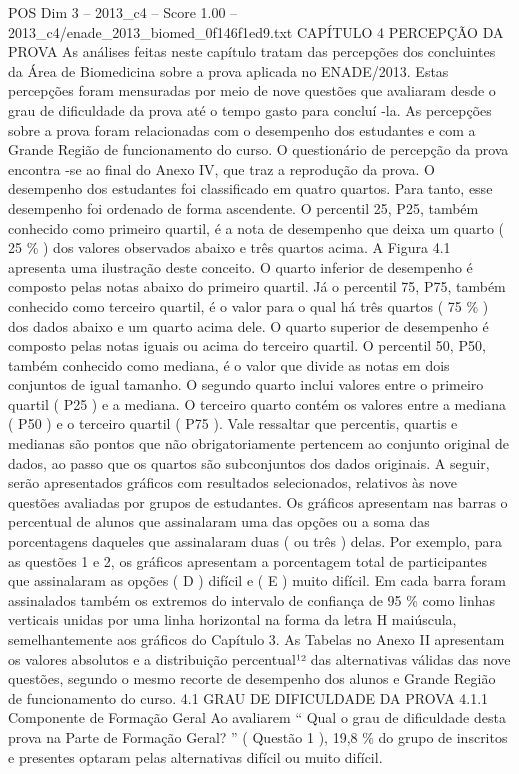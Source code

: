 \begin{textsample}{POS Dim 3 – 2013\_c4 – Score 1.00 – 2013\_c4/enade\_2013\_biomed\_0f146f1ed9.txt}  \label{ex:f3_pos_162}
CAPÍTULO 4 PERCEPÇÃO DA PROVA As análises feitas neste capítulo tratam das percepções dos concluintes da Área de Biomedicina sobre a prova aplicada no ENADE/2013.
Estas percepções foram mensuradas por meio de nove questões que avaliaram desde o grau de dificuldade da prova até o tempo gasto para concluí -la.
As percepções sobre a prova foram relacionadas com o desempenho dos estudantes e com a Grande Região de funcionamento do curso.
O questionário de percepção da prova encontra -se ao final do Anexo IV, que traz a reprodução da prova.
O desempenho dos estudantes foi classificado em quatro quartos.
Para tanto, esse desempenho foi ordenado de forma ascendente.
O percentil 25, P25, também conhecido como primeiro quartil, é a nota de desempenho que deixa um quarto ( 25 \% ) dos valores observados abaixo e três quartos acima.
A Figura 4.1 apresenta uma ilustração deste conceito.
O quarto inferior de desempenho é composto pelas notas abaixo do primeiro quartil.
Já o percentil 75, P75, também conhecido como terceiro quartil, é o valor para o qual há três quartos ( 75 \% ) dos dados abaixo e um quarto acima dele.
O quarto superior de desempenho é composto pelas notas iguais ou acima do terceiro quartil.
O percentil 50, P50, também conhecido como mediana, é o valor que divide as notas em dois conjuntos de igual tamanho.
O segundo quarto inclui valores entre o primeiro quartil ( P25 ) e a mediana.
O terceiro quarto contém os valores entre a mediana ( P50 ) e o terceiro quartil ( P75 ).
Vale ressaltar que percentis, quartis e medianas são pontos que não obrigatoriamente pertencem ao conjunto original de dados, ao passo que os quartos são subconjuntos dos dados originais.
A seguir, serão apresentados gráficos com resultados selecionados, relativos às nove questões avaliadas por grupos de estudantes.
Os gráficos apresentam nas barras o percentual de alunos que assinalaram uma das opções ou a soma das porcentagens daqueles que assinalaram duas ( ou três ) delas.
Por exemplo, para as questões 1 e 2, os gráficos apresentam a porcentagem total de participantes que assinalaram as opções ( D ) difícil e ( E ) muito difícil.
Em cada barra foram assinalados também os extremos do intervalo de confiança de 95 \% como linhas verticais unidas por uma linha horizontal na forma da letra H maiúscula, semelhantemente aos gráficos do Capítulo 3.
As Tabelas no Anexo II apresentam os valores absolutos e a distribuição percentual¹² das alternativas válidas das nove questões, segundo o mesmo recorte de desempenho dos alunos e Grande Região de funcionamento do curso. 4.1 GRAU DE DIFICULDADE DA PROVA 4.1.1 Componente de Formação Geral Ao avaliarem “ Qual o grau de dificuldade desta prova na Parte de Formação Geral? ” ( Questão 1 ), 19,8 \% do grupo de inscritos e presentes optaram pelas alternativas difícil ou muito difícil.

\end{textsample}
